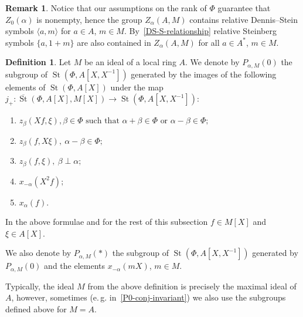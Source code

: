 \documentclass[oneside, 8pt]{amsart}
\theoremstyle{remark}
\theoremstyle{definition}
\newtheorem{df}[lemma]{Definition} \Crefname{df}{Definition}{Definitions}
\newtheorem{rem}[lemma]{Remark}
\DeclareMathOperator{\St}{St}
\numberwithin{equation}{section}
\begin{document}
\begin{rem}\label{Z-DS} Notice that our assumptions on the rank of $\Phi$ guarantee that $Z_0(\alpha)$ is nonempty, hence the group $Z_\alpha(A, M)$ contains relative Dennis--Stein symbols $\langle a, m \rangle$ for $a\in A$, $m\in M$.
By~\eqref{DS-S-relationship} relative Steinberg symbols $\{a, 1+m\}$ are also contained in $Z_\alpha(A, M)$ for all $a\in A^*$, $m\in M$. \end{rem}

\begin{df} \label{defP0}
Let $M$ be an ideal of a local ring $A$. We denote by $P_{\alpha, M}(0)$ the subgroup of $\St(\Phi, A[X, X^{-1}])$ generated by the images of the following elements of $\St(\Phi, A[X])$ under the
 map $j_+ \colon \overline{\St}(\Phi, A[X], M[X]) \to \St(\Phi, A[X, X^{-1}])$:
\begin{enumerate} \item $z_{\beta}(Xf, \xi), \beta \in \Phi \text{ such that }\alpha + \beta \in \Phi\text{ or } \alpha - \beta \in \Phi;$
 \item $z_{\beta}(f, X\xi),\ \alpha - \beta \in \Phi;$
 \item $z_{\beta}(f, \xi),\ \beta \perp \alpha;$
 \item $x_{-\alpha}(X^2f);$
 \item $x_{\alpha}(f)$. \end{enumerate}
In the above formulae and for the rest of this subsection $f \in M[X]$ and $\xi \in A[X]$. 

We also denote by $P_{\alpha, M}(*)$ the subgroup of $\St(\Phi, A[X, X^{-1}])$ generated by $P_{\alpha, M}(0)$ and the elements $x_{-\alpha}(mX)$, $m \in M$.
\end{df}

Typically, the ideal $M$ from the above definition is precisely the maximal ideal of $A$, however, sometimes (e.\,g. in~\cref{P0-conj-invariant}) we also use the subgroups defined above for $M=A$.
\end{document}
